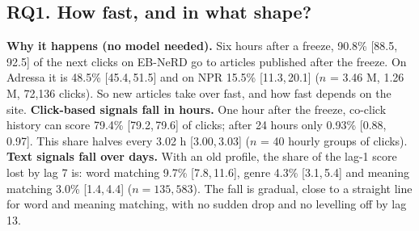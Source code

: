 \documentclass[11pt,a4paper]{article}
\newcommand{\ci}[2]{[#1,\,#2]}
\begin{document}
\subsection{RQ1. How fast, and in what shape?}
\textbf{Why it happens (no model needed).} Six hours after a freeze, 90.8\% \ci{88.5}{92.5} of the next clicks on EB-NeRD go to articles published after the freeze. On Adressa it is 48.5\% \ci{45.4}{51.5} and on NPR 15.5\% \ci{11.3}{20.1} ($n$ = 3.46 M, 1.26 M, 72{,}136 clicks). So new articles take over fast, and how fast depends on the site. \textbf{Click-based signals fall in hours.} One hour after the freeze, co-click history can score 79.4\% \ci{79.2}{79.6} of clicks; after 24 hours only 0.93\% \ci{0.88}{0.97}. This share halves every 3.02 h \ci{3.00}{3.03} ($n$ = 40 hourly groups of clicks). \textbf{Text signals fall over days.} With an old profile, the share of the lag-1 score lost by lag 7 is: word matching 9.7\% \ci{7.8}{11.6}, genre 4.3\% \ci{3.1}{5.4} and meaning matching 3.0\% \ci{1.4}{4.4} ($n=135{,}583$). The fall is gradual, close to a straight line for word and meaning matching, with no sudden drop and no levelling off by lag 13.
\end{document}

